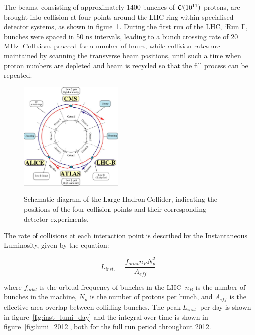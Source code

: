 The beams, consisting of approximately 1400 bunches of $\mathcal{O}(10^{11})$ protons,
are brought into collision
at four points around the LHC ring within specialised detector systems, as shown
in figure~\ref{fig:lhc_diagram}. During the
first run of the LHC, `Run I', bunches were spaced in 50 ns intervals, leading to
a bunch crossing rate of 20 MHz. Collisions proceed for a number of hours, 
while collision rates are maintained by scanning the transverse beam positions, 
until such a time when proton numbers are depleted and beam is recycled so that 
the fill process can be repeated.

\begin{figure}[hb!]
\centering
\includegraphics[width=0.45\textwidth]{Figs/machine/lhc-schematic.jpg}
\label{fig:lhc_diagram}
\caption{Schematic diagram of the Large Hadron Collider, indicating the 
positions of the four collision points and their corresponding detector 
experiments.}
\end{figure}

The rate of collisions at each interaction point is described by the 
Instantaneous Luminosity, given by the equation:

\begin{equation}
L_{inst.} = \frac{f_{orbit}n_{B}N_p^2}{A_{eff}}
\end{equation}

where $f_{orbit}$ is the orbital frequency of bunches in the LHC, $n_B$ is the 
number of bunches in the machine, $N_p$ is the number of protons per bunch, and 
$A_{eff}$ is the effective area overlap between colliding bunches. The peak 
$L_{inst.}$ per day is shown in figure~\ref{fig:inst_lumi_day} and the integral
over time is shown in figure~\ref{fig:lumi_2012}, both for the full run period
throughout 2012.

